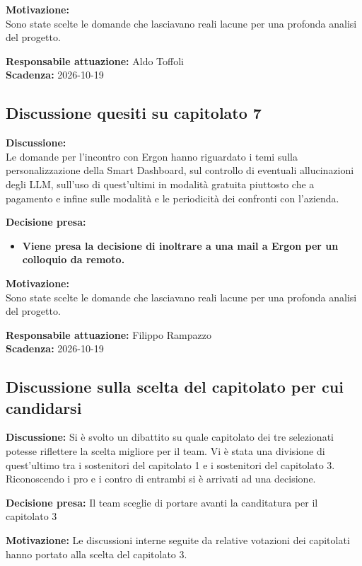 \documentclass[12pt,a4paper]{article}
\newcommand{\tightlist}{\setlength{\itemsep}{1pt}\setlength{\parskip}{0pt}}
\begin{document}
\textbf{Motivazione:} \\
{Sono state scelte le domande che lasciavano reali lacune per una profonda analisi del progetto.}

\textbf{Responsabile attuazione:} Aldo Toffoli\\
\textbf{Scadenza:} 2026-10-19

\hypertarget{argomento-3}{%
\subsection{Discussione quesiti su capitolato 7}}

\textbf{Discussione:} \\
{
Le domande per l'incontro con Ergon hanno riguardato i temi sulla personalizzazione della Smart Dashboard, sul controllo di eventuali allucinazioni degli LLM, sull'uso di quest'ultimi in modalità gratuita piuttosto che a pagamento e infine sulle modalità e le periodicità dei confronti con l'azienda.
}

\textbf{Decisione presa:}
\begin{itemize}
\tightlist
\item[$\checkmark$] \textbf {Viene presa la decisione di inoltrare a  una mail a Ergon per un colloquio da remoto.}
\end{itemize}

\textbf{Motivazione:} \\
{Sono state scelte le domande che lasciavano reali lacune per una profonda analisi del progetto.}

\textbf{Responsabile attuazione:} Filippo Rampazzo\\
\textbf{Scadenza:} 2026-10-19

\hypertarget{argomento-4}{%
\subsection{Discussione sulla scelta del capitolato per cui candidarsi}}

\textbf{Discussione:} {
Si è svolto un dibattito su quale capitolato dei tre selezionati potesse riflettere la scelta migliore per il team. Vi è stata una divisione di quest'ultimo tra i sostenitori del capitolato 1 e i sostenitori del capitolato 3. Riconoscendo  i pro e i contro di entrambi si è arrivati ad una decisione. 
}

\textbf{Decisione presa:} {Il team sceglie di portare avanti la canditatura per il capitolato 3}


\textbf{Motivazione:} Le discussioni interne seguite da relative votazioni dei capitolati hanno portato alla scelta del capitolato 3.
\end{document}
